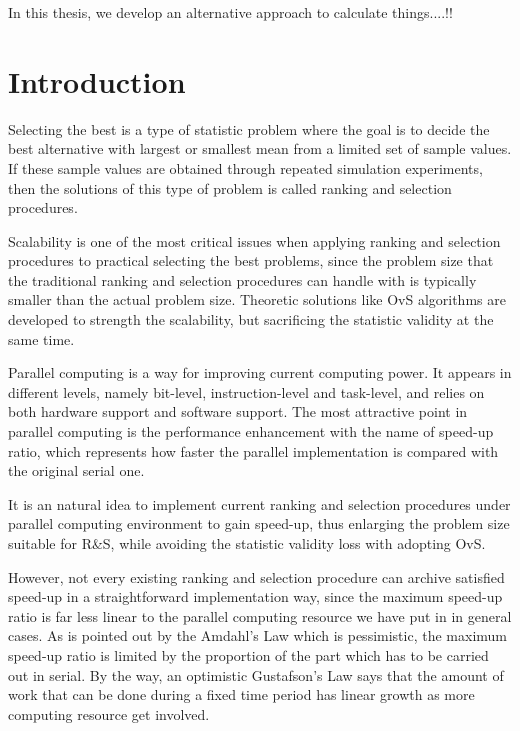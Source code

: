 \documentclass[12pt,a4]{report}
\begin{document}
In this thesis, we develop an alternative approach to calculate things....!!


\newpage
{}

\chapter{Introduction}

Selecting the best is a type of statistic problem where the goal is to decide the best alternative with largest or smallest mean from a limited set of sample values. If these sample values are obtained through repeated simulation experiments, then the solutions of this type of problem is called ranking and selection procedures.

Scalability is one of the most critical issues when applying ranking and selection procedures to practical selecting the best problems, since the problem size that the traditional ranking and selection procedures can handle with is typically smaller than the actual problem size. Theoretic solutions like OvS algorithms are developed to strength the scalability, but sacrificing the statistic validity at the same time.

Parallel computing is a way for improving current computing power. It appears in different levels, namely bit-level, instruction-level and task-level, and relies on both hardware support and software support. The most attractive point in parallel computing is the performance enhancement with the name of speed-up ratio, which represents how faster the parallel implementation is compared with the original serial one.

It is an natural idea to implement current ranking and selection procedures under parallel computing environment to gain speed-up, thus enlarging the problem size suitable for R\&S, while avoiding the statistic validity loss with adopting OvS.

However, not every existing ranking and selection procedure can archive satisfied speed-up in a straightforward implementation way, since the maximum speed-up ratio is far less linear to the parallel computing resource we have put in in general cases. As is pointed out by the Amdahl's Law which is pessimistic, the maximum speed-up ratio is limited by the proportion of the part which has to be carried out in serial. By the way, an optimistic Gustafson's Law says that the amount of work that can be done during a fixed time period has linear growth as more computing resource get involved.
\end{document}
